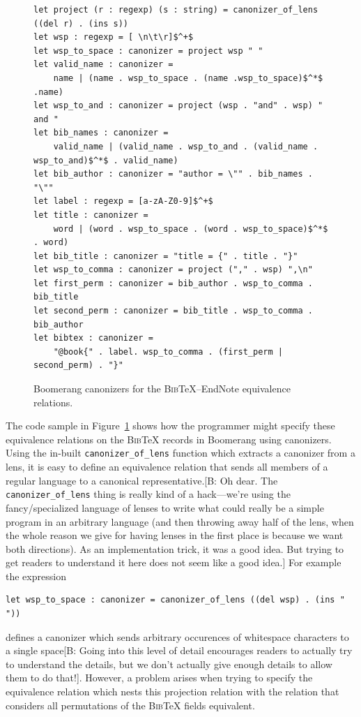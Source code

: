 \documentclass{svproc}
\newcommand{\cd}[1]{\lstinline[backgroundcolor=\color{white}]$#1$}
\newcommand{\FINISH}[3]{\ifdraft\textcolor{#1}{[#2: #3]}\fi}
\newcommand{\bcp}[1]{\FINISH{dkred}{B}{#1}}
\newcommand{\bibtex}{\textsc{Bib}\TeX{}}
\begin{document}
\begin{figure}[t]
\begin{lstlisting}
let project (r : regexp) (s : string) = canonizer_of_lens ((del r) . (ins s))
let wsp : regexp = [ \n\t\r]$^+$
let wsp_to_space : canonizer = project wsp " "
let valid_name : canonizer = 
    name | (name . wsp_to_space . (name .wsp_to_space)$^*$ .name)
let wsp_to_and : canonizer = project (wsp . "and" . wsp) " and "
let bib_names : canonizer =  
    valid_name | (valid_name . wsp_to_and . (valid_name . wsp_to_and)$^*$ . valid_name)
let bib_author : canonizer = "author = \"" . bib_names . "\""
let label : regexp = [a-zA-Z0-9]$^+$
let title : canonizer = 
    word | (word . wsp_to_space . (word . wsp_to_space)$^*$ . word)
let bib_title : canonizer = "title = {" . title . "}"
let wsp_to_comma : canonizer = project ("," . wsp) ",\n"
let first_perm : canonizer = bib_author . wsp_to_comma . bib_title
let second_perm : canonizer = bib_title . wsp_to_comma . bib_author
let bibtex : canonizer = 
    "@book{" . label. wsp_to_comma . (first_perm | second_perm) . "}"
\end{lstlisting}

  \caption{Boomerang canonizers for the \bibtex{}--EndNote equivalence
    relations.}
  \label{fig:example-canonizers}
\end{figure}
The code sample in Figure~\ref{fig:example-canonizers} shows how the programmer
might specify these equivalence relations on the \bibtex{} records in Boomerang
using canonizers.
%
Using the in-built \cd{canonizer_of_lens} function which extracts a canonizer
from a lens, it is easy to define an equivalence relation that sends all
members of a regular language to a canonical representative.\bcp{Oh dear.
  The \cd{canonizer_of_lens} thing is really kind of a hack---we're using
  the fancy/specialized language of lenses to write what could really be a
  simple program in an arbitrary language (and then throwing away half of the
  lens, when the whole reason we give for having lenses in the first place
  is because we want both directions).  As an implementation trick, it was a
good idea.  But trying to get readers to understand it here does not seem
like a good idea.} For example
the expression 
\begin{lstlisting}
let wsp_to_space : canonizer = canonizer_of_lens ((del wsp) . (ins " "))
\end{lstlisting}
\noindent defines a canonizer which sends arbitrary occurences of whitespace
characters to a single space\bcp{Going into this level of detail encourages
readers to actually try to understand the details, but we don't actually
give enough details to allow them to do that!}. However, a problem arises
when trying to specify 
the equivalence relation which nests this projection relation with the relation
that considers all permutations of the \bibtex{} fields equivalent.
\end{document}
